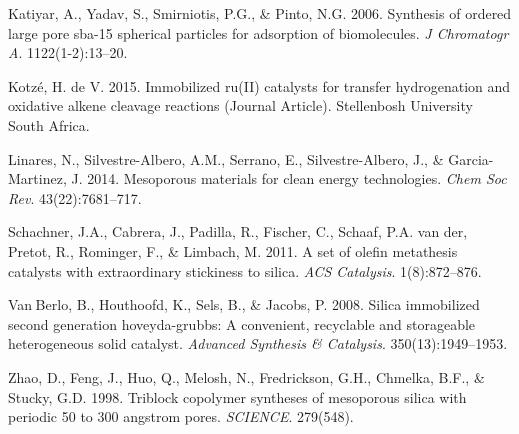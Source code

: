 \documentclass[]{article}
\begin{document}
\leavevmode\hypertarget{ref-RN89}{}%
Katiyar, A., Yadav, S., Smirniotis, P.G., \& Pinto, N.G. 2006. Synthesis
of ordered large pore sba-15 spherical particles for adsorption of
biomolecules. \emph{J Chromatogr A}. 1122(1-2):13--20.

\leavevmode\hypertarget{ref-RN90}{}%
Kotzé, H. de V. 2015. Immobilized ru(II) catalysts for transfer
hydrogenation and oxidative alkene cleavage reactions (Journal Article).
Stellenbosh University South Africa.

\leavevmode\hypertarget{ref-RN87}{}%
Linares, N., Silvestre-Albero, A.M., Serrano, E., Silvestre-Albero, J.,
\& Garcia-Martinez, J. 2014. Mesoporous materials for clean energy
technologies. \emph{Chem Soc Rev}. 43(22):7681--717.

\leavevmode\hypertarget{ref-RN85}{}%
Schachner, J.A., Cabrera, J., Padilla, R., Fischer, C., Schaaf, P.A. van
der, Pretot, R., Rominger, F., \& Limbach, M. 2011. A set of olefin
metathesis catalysts with extraordinary stickiness to silica. \emph{ACS
Catalysis}. 1(8):872--876.

\leavevmode\hypertarget{ref-RN74}{}%
Van Berlo, B., Houthoofd, K., Sels, B., \& Jacobs, P. 2008. Silica
immobilized second generation hoveyda-grubbs: A convenient, recyclable
and storageable heterogeneous solid catalyst. \emph{Advanced Synthesis
\& Catalysis}. 350(13):1949--1953.

\leavevmode\hypertarget{ref-RN69}{}%
Zhao, D., Feng, J., Huo, Q., Melosh, N., Fredrickson, G.H., Chmelka,
B.F., \& Stucky, G.D. 1998. Triblock copolymer syntheses of mesoporous
silica with periodic 50 to 300 angstrom pores. \emph{SCIENCE}. 279(548).
\end{document}
